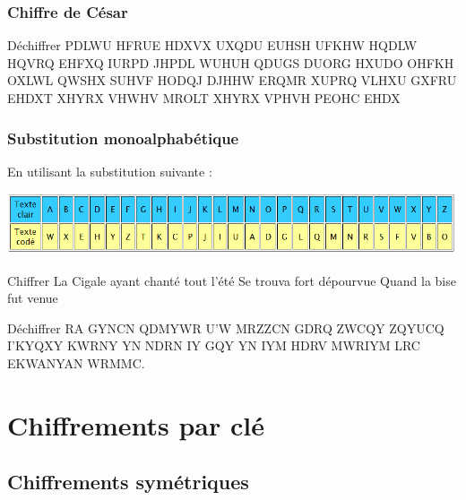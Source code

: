 \documentclass[xcolor={dvipsnames}]{beamer}
\begin{document}
\begin{frame}
	\frametitle{Chiffre de César}	
	
	
	\begin{block}{Déchiffrer}
		PDLWU HFRUE HDXVX UXQDU EUHSH UFKHW HQDLW HQVRQ EHFXQ IURPD JHPDL WUHUH QDUGS DUORG HXUDO OHFKH OXLWL QWSHX SUHVF HODQJ DJHHW ERQMR XUPRQ VLHXU GXFRU EHDXT XHYRX VHWHV MROLT XHYRX VPHVH PEOHC EHDX
	\end{block}
\end{frame}

\begin{frame}
	\frametitle{Substitution monoalphabétique}	
	
	En utilisant la substitution suivante :
	\begin{center}
		\includegraphics[scale=0.5]{subst}
	\end{center}
	
	\begin{block}{Chiffrer}
		La Cigale ayant chanté tout l'été
		Se trouva fort dépourvue
		Quand la bise fut venue
	\end{block}
	
	\begin{block}{Déchiffrer}
		RA GYNCN QDMYWR U'W MRZZCN GDRQ ZWCQY ZQYUCQ I'KYQXY KWRNY YN NDRN IY GQY YN IYM HDRV MWRIYM LRC EKWANYAN WRMMC.
	\end{block}
\end{frame}



\section{Chiffrements par clé}

\subsection{Chiffrements symétriques}
\end{document}
